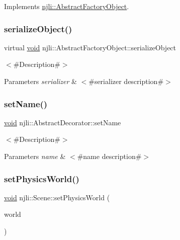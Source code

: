 Implements \mbox{\hyperlink{classnjli_1_1_abstract_factory_object_aad2fbe86fb3bdecf02918a96b9c57976}{njli\+::\+Abstract\+Factory\+Object}}.

\mbox{\label{classnjli_1_1_scene_a4fc4bcd9d1930911474210c047372fc0}} 
\subsubsection{\texorpdfstring{serialize\+Object()}{serializeObject()}}
{\footnotesize\ttfamily virtual \mbox{\hyperlink{_thread_8h_af1e856da2e658414cb2456cb6f7ebc66}{void}} njli\+::\+Abstract\+Factory\+Object\+::serialize\+Object}

$<$\#\+Description\#$>$


\begin{DoxyParams}{Parameters}
{\em serializer} & $<$\#serializer description\#$>$ \\
\hline
\end{DoxyParams}
\mbox{\label{classnjli_1_1_scene_a087eb5f8d9f51cc476f12f1d10a3cb95}} 
\subsubsection{\texorpdfstring{set\+Name()}{setName()}}
{\footnotesize\ttfamily \mbox{\hyperlink{_thread_8h_af1e856da2e658414cb2456cb6f7ebc66}{void}} njli\+::\+Abstract\+Decorator\+::set\+Name}

$<$\#\+Description\#$>$


\begin{DoxyParams}{Parameters}
{\em name} & $<$\#name description\#$>$ \\
\hline
\end{DoxyParams}
\mbox{\label{classnjli_1_1_scene_a81fba745ce70cb12f08c522627ff43fc}} 
\subsubsection{\texorpdfstring{set\+Physics\+World()}{setPhysicsWorld()}}
{\footnotesize\ttfamily \mbox{\hyperlink{_thread_8h_af1e856da2e658414cb2456cb6f7ebc66}{void}} njli\+::\+Scene\+::set\+Physics\+World (\begin{DoxyParamCaption}\item[{\mbox{\hyperlink{classnjli_1_1_physics_world}{Physics\+World}} $\ast$}]{world }\end{DoxyParamCaption})}

